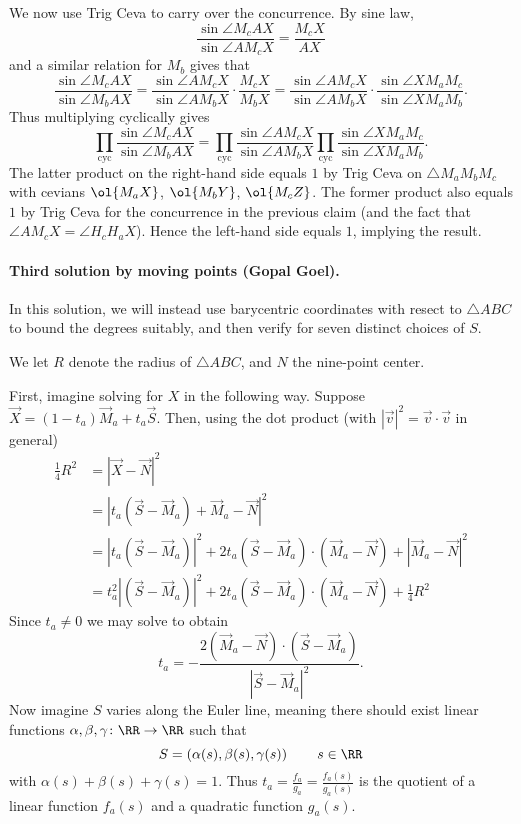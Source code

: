 \documentclass[11pt]{scrartcl}
\begin{document}
We now use Trig Ceva to carry over the concurrence.
By sine law,
\[ \frac{\sin \angle M_{c}AX}{\sin \angle AM_{c}X}
  =\frac{M_{c}X}{AX} \]
and a similar relation for $M_b$ gives that
\[ \frac{\sin \angle M_{c}AX}{\sin \angle M_{b}AX}
  = \frac{\sin \angle AM_{c}X}{\sin \angle AM_{b}X} \cdot \frac{M_{c}X}{M_{b}X}
  = \frac{\sin \angle AM_{c}X}{\sin \angle AM_{b}X}
  \cdot \frac{\sin \angle XM_{a}M_{c}}{\sin \angle XM_{a}M_{b}}. \]
Thus multiplying cyclically gives
\[ \prod_{\text{cyc}} \frac{\sin \angle M_{c}AX}{\sin \angle M_{b}AX}
  = \prod_{\text{cyc}} \frac{\sin \angle AM_{c}X}{\sin \angle AM_{b}X}
  \prod_{\text{cyc}} \frac{\sin \angle XM_{a}M_{c}}{\sin \angle XM_{a}M_{b}}. \]
The latter product on the right-hand side equals $1$
by Trig Ceva on $\triangle M_a M_b M_c$ with cevians
$\ol{M_a X}$, $\ol{M_b Y}$, $\ol{M_c Z}$.
The former product also equals $1$
by Trig Ceva for the concurrence in the previous claim
(and the fact that $\angle AM_{c}X=\angle H_{c}H_{a}X$).
Hence the left-hand side equals $1$, implying the result.

\paragraph{Third solution by moving points (Gopal Goel).}
In this solution,
we will instead use barycentric coordinates with resect to $\triangle ABC$
to bound the degrees suitably,
and then verify for seven distinct choices of $S$.

We let $R$ denote the radius of $\triangle ABC$,
and $N$ the nine-point center.

First, imagine solving for $X$ in the following way.
Suppose $\vec X = (1-t_a) \vec M_a + t_a \vec S$.
Then, using the dot product
(with $\left\lvert \vec v \right\rvert^2 = \vec v \cdot \vec v$ in general)
\begin{align*}
  \frac14 R^2
  &= \left\lvert \vec X - \vec N \right\rvert^2 \\
  &= \left\lvert t_a(\vec S - \vec M_a) + \vec M_a - \vec N \right\rvert^2 \\
  &= \left\lvert t_a(\vec S - \vec M_a) \right\rvert^2
    + 2t_a \left( \vec S - \vec M_a \right) \cdot \left( \vec M_a - \vec N \right)
    + \left\lvert \vec M_a - \vec N \right\rvert^2 \\
  &= t_a^2 \left\lvert (\vec S - \vec M_a) \right\rvert^2
    + 2t_a \left( \vec S - \vec M_a \right) \cdot \left( \vec M_a - \vec N \right)
    + \frac 14 R^2
\end{align*}
Since $t_a \neq 0$ we may solve to obtain
\[ t_a = -\frac{2(\vec M_a - \vec N) \cdot (\vec S - \vec M_a)}%
  {\left\lvert \vec S - \vec M_a \right\rvert^2}.  \]
Now imagine $S$ varies along the Euler line,
meaning there should exist linear functions
$\alpha, \beta, \gamma \colon \RR \to \RR$ such that
\[ S = \left( \alpha(s) , \beta(s) , \gamma(s) \right)
  \qquad s \in \RR \]
with $\alpha(s) + \beta(s) + \gamma(s) = 1$.
Thus $t_a = \frac{f_a}{g_a} = \frac{f_a(s)}{g_a(s)}$
is the quotient of a linear function
$f_a(s)$ and a quadratic function $g_a(s)$.
\end{document}

